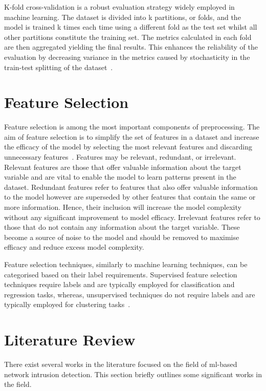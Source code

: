 K-fold cross-validation is a robust evaluation strategy widely employed in
machine learning. The dataset is divided into k partitions, or folds, and the
model is trained k times each time using a different fold as the test set
whilst all other partitions constitute the training set. The metrics calculated
in each fold are then aggregated yielding the final results. This enhances the
reliability of the evaluation by decreasing variance in the metrics caused by
stochasticity in the train-test splitting of the dataset~\cite{kfoldcv}.

\section{Feature Selection}%
\label{sec:feat_eng}
Feature selection is among the most important components of preprocessing.
The aim of feature selection is to simplify the set of features in a dataset and
increase the efficacy of the model by selecting the most relevant features and
discarding unnecessary features~\cite{feat-sel}. Features may be relevant,
redundant, or irrelevant. Relevant features are those that offer valuable
information about the target variable and are vital to enable the model to
learn patterns present in the dataset. Redundant features refer to features
that also offer valuable information to the model however are superseded by
other features that contain the same or more information. Hence, their
inclusion will increase the model complexity without any significant
improvement to model efficacy. Irrelevant features refer to those that do not
contain any information about the target variable. These become a source of
noise to the model and should be removed to maximise efficacy and reduce excess
model complexity.

Feature selection techniques, similarly to machine learning techniques, can be
categorised based on their label requirements. Supervised feature selection
techniques require labels and are typically employed for classification and
regression tasks, whereas, unsupervised techniques do not require labels and
are typically employed for clustering tasks~\cite{feat-sel}.

\section{Literature Review}%
\label{sec:literature}

There exist several works in the literature focused on the field of
\gls{ml}-based network intrusion detection. This section briefly outlines some
significant works in the field.

